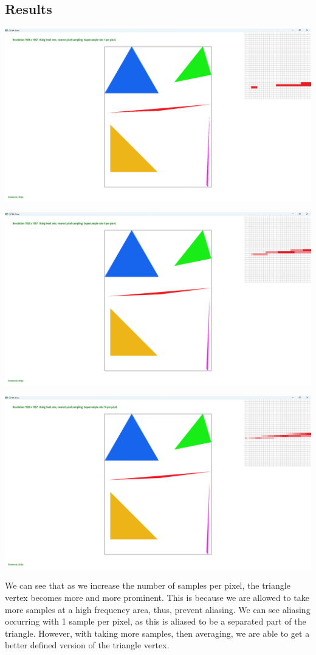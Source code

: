 \documentclass{article}
\begin{document}
\subsection{Results}
\begin{center}
    \includegraphics[]{Task 2/1.png}

    \includegraphics[]{Task 2/4.png}


    \includegraphics[]{Task 2/16.png}
\end{center}
We can see that as we increase the number of samples per pixel, the triangle vertex becomes more and more prominent. This is because we are allowed to take more samples at a high frequency area, thus, prevent aliasing. We can see aliasing occurring with 1 sample per pixel, as this is aliased to be a separated part of the triangle. However, with taking more samples, then averaging, we are able to get a better defined version of the triangle vertex.
\end{document}
